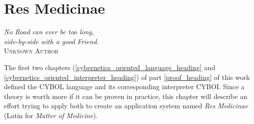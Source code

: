%
%
%
%
%
%
%

\chapter{Res Medicinae}
\label{res_medicinae_heading}

\begin{flushright}
    \textsl{
        No Road can ever be too long,\\
        side-by-side with a good Friend.
    }\\
    \textsc{Unknown Author}
\end{flushright}

The first two chapters (\ref{cybernetics_oriented_language_heading} and
\ref{cybernetics_oriented_interpreter_heading}) of part \ref{proof_heading} of
this work defined the CYBOL language and its corresponding interpreter CYBOI.
Since a theory is worth more if it can be proven in practice, this chapter will
describe an effort trying to apply both to create an application system named
\emph{Res Medicinae} \cite{resmedicinae} (Latin for \emph{Matter of Medicine}).



\newpage


